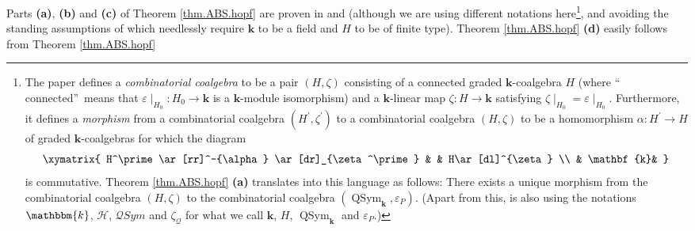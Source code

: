\documentclass[numbers=enddot,12pt,final,onecolumn,notitlepage,abstracton]{scrartcl}%
\theoremstyle{definition}
\newcommand{\kk}{\mathbf{k}}
\begin{document}
Parts \textbf{(a)}, \textbf{(b)} and \textbf{(c)} of Theorem
\ref{thm.ABS.hopf} are proven in \cite[proof of Theorem 4.1]{ABS} and
\cite[proof of Theorem 7.1.3]{Reiner} (although we are using different
notations here\footnote{The paper \cite{ABS} defines a \textit{combinatorial
coalgebra} to be a pair $\left(  H,\zeta\right)  $ consisting of a connected
graded $\mathbf{k}$-coalgebra $H$ (where \textquotedblleft
connected\textquotedblright\ means that $\varepsilon\mid_{H_{0}}%
:H_{0}\rightarrow\mathbf{k}$ is a $\mathbf{k}$-module isomorphism) and a
$\mathbf{k}$-linear map $\zeta:H\rightarrow\mathbf{k}$ satisfying $\zeta
\mid_{H_{0}}=\varepsilon\mid_{H_{0}}$. Furthermore, it defines a
\textit{morphism} from a combinatorial coalgebra $\left(  H^{\prime}%
,\zeta^{\prime}\right)  $ to a combinatorial coalgebra $\left(  H,\zeta
\right)  $ to be a homomorphism $\alpha:H^{\prime}\rightarrow H$ of graded
$\mathbf{k}$-coalgebras for which the diagram%
\[%
\xymatrix{
H^\prime\ar[rr]^-{\alpha} \ar[dr]_{\zeta^\prime} & & H\ar[dl]^{\zeta} \\
& \kk&
}%
\]
is commutative. Theorem \ref{thm.ABS.hopf} \textbf{(a)} translates into this
language as follows: There exists a unique morphism from the combinatorial
coalgebra $\left(  H,\zeta\right)  $ to the combinatorial coalgebra $\left(
\operatorname*{QSym}\nolimits_{\mathbf{k}},\varepsilon_{P}\right)  $. (Apart
from this, \cite{ABS} is also using the notations $\mathbbm{k}$, $\mathcal{H}%
$, $\mathcal{Q}Sym$ and $\zeta_{\mathcal{Q}}$ for what we call $\mathbf{k}$,
$H$, $\operatorname*{QSym}\nolimits_{\mathbf{k}}$ and $\varepsilon_{P}$.)},
and avoiding the standing assumptions of \cite{ABS} which needlessly require
$\mathbf{k}$ to be a field and $H$ to be of finite type). Theorem
\ref{thm.ABS.hopf} \textbf{(d)} easily follows from Theorem \ref{thm.ABS.hopf}
\end{document}
